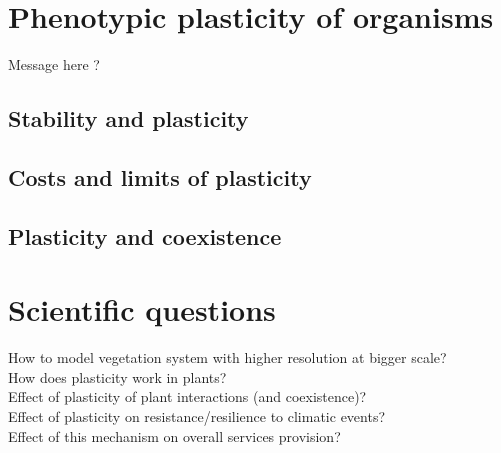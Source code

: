 \chapter{Phenotypic plasticity of organisms}
Message here ?

\section{Stability and plasticity}

\section{Costs and limits of plasticity}

\section{Plasticity and coexistence}


\chapter*{Scientific questions}
How to model vegetation system with higher resolution at bigger scale?\\
How does plasticity work in plants?\\
Effect of plasticity of plant interactions (and coexistence)?\\
Effect of plasticity on resistance/resilience to climatic events?\\
Effect of this mechanism on overall services provision?




